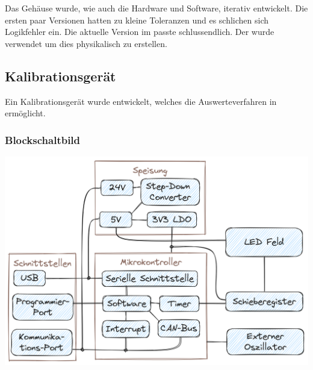 Das Gehäuse wurde, wie auch die Hardware und Software, iterativ entwickelt.
Die ersten paar Versionen hatten zu kleine Toleranzen und es schlichen sich Logikfehler ein.
Die aktuelle Version im  passte schlussendlich.
Der  wurde verwendet um dies physikalisch zu erstellen.


\subsection{Kalibrationsgerät} %

Ein Kalibrationsgerät wurde entwickelt, welches die Auswerteverfahren in  ermöglicht.

\subsubsection{Blockschaltbild}

\includegraphics[width=\linewidth]{../images/blockschaltbild.png}
\vspace{-3em}
\vspace{0.5em}
\label{img:Blockschaltbild}

